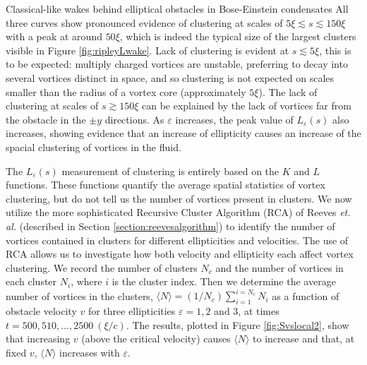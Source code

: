 \begin{chapter}{\label{cha:wake}Classical-like wakes behind elliptical obstacles in Bose-Einstein condensates}
All three curves show pronounced evidence of clustering at scales of $5\xi\lesssim s\lesssim 150\xi$ with a peak at around $50\xi$, which is indeed the typical size of the largest clusters visible in Figure \ref{fig:ripleyLwake}. Lack of clustering is evident at $s\lesssim 5\xi$, this is to be expected: multiply charged vortices are unstable, preferring to decay into several vortices distinct in space, and so clustering is not expected on scales smaller than the radius of a vortex core (approximately $5\xi$). The lack of clustering at scales of $s \gtrsim 150\xi$ can be explained by the lack of vortices far from the obstacle in the $\pm y$ directions. As $\varepsilon$ increases, the peak value of $L_\varepsilon(s)$ also increases, showing evidence that an increase of ellipticity causes an increase of the spacial clustering of vortices in the fluid.

The $L_\varepsilon(s)$ measurement of clustering is entirely based on the $K$ and $L$ functions. These functions quantify the average spatial statistics of vortex clustering, but do not tell us the number of vortices present in clusters. We now utilize the more sophisticated Recursive Cluster Algorithm (RCA) of Reeves \emph{et. al.} \cite{reeves_billam_13} (described in Section \ref{section:reevesalgorithm}) to identify the number of vortices contained in clusters for different ellipticities and velocities. The use of RCA allows us to investigate how both velocity and ellipticity each affect vortex clustering. We record the number of clusters $N_c$ and the number of vortices in each cluster $N_i$, where $i$ is the cluster index. Then we determine the average number of vortices in the clusters, $\langle N \rangle = (1/N_c) \sum_{i=1}^{i=N_c} N_i$ as a function of obstacle velocity $v$ for three ellipticities $\varepsilon=1, 2$ and $3$, at times $t=500,510,\ldots,2500~(\xi/c)$. The results, plotted in Figure \ref{fig:Svslocal2}, show that increasing $v$ (above the critical velocity) causes $\langle N \rangle$ to increase and that, at fixed $v$, $\langle N \rangle$ increases with $\varepsilon$. 


\end{chapter}
